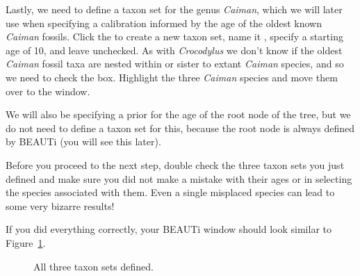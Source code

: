 {    Lastly, we need to define a taxon set for the genus \emph{Caiman}, which
    we will later use when specifying a calibration informed by the
    age of the oldest known \emph{Caiman} fossils.
    Click the \plusbutton to create a new taxon set, name it ,
    specify a starting age of 10, and leave  unchecked.
    As with \emph{Crocodylus} we don't know if the oldest \emph{Caiman} fossil
    taxa are nested within or sister to extant \emph{Caiman} species, and so
    we need to check the  box.
    Highlight the three \emph{Caiman} species and move them over to the
     window.

    We will also be specifying a prior for the age of the root node of the
    tree, but we do not need to define a taxon set for this, because the root
    node is always defined by BEAUTi (you will see this later).

    Before you proceed to the next step, double check the three taxon sets
    you just defined and make sure you did not make a mistake with their
    ages or in selecting the species associated with them. Even a single
    misplaced species can lead to some very bizarre results!

    If you did everything correctly, your BEAUTi window should look similar to
    Figure~\ref{fig:beautiTaxSets}.

    \begin{figure}[htbp]
        \centering
        \caption{All three taxon sets defined.}
        \label{fig:beautiTaxSets}
    \end{figure}
}

